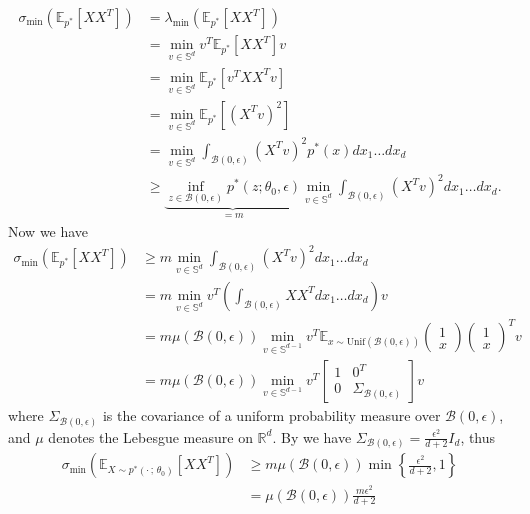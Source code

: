 \documentclass[11pt]{article}
\begin{document}
\begin{align*}
    \sigma_{\min}\left(\mathbb{E}_{p^*}\left[XX^{T}\right]\right) &= \lambda_{\min}\left(\mathbb{E}_{p^*}\left[XX^{T}\right]\right) \\
    &= \min_{v \in \mathbb{S}^{d}}v^{T}\mathbb{E}_{p^*}\left[XX^{T}\right]v \\
    &= \min_{v \in \mathbb{S}^{d}}\mathbb{E}_{p^*}\left[v^{T}XX^{T}v\right] \\
    &= \min_{v \in \mathbb{S}^{d}}\mathbb{E}_{p^*}\left[(X^{T}v)^2\right] \\
    &= \min_{v \in \mathbb{S}^{d}} \int_{\mathcal{B}(0, \epsilon)}(X^{T}v)^2p^*(x)dx_1\dots dx_d \\
    & \geq \underbrace{\inf_{z\in \mathcal{B}(0, \epsilon)}p^*(z;\theta_0, \epsilon)}_{=m}\min_{v \in \mathbb{S}^{d}} \int_{\mathcal{B}(0, \epsilon)}(X^{T}v)^2dx_1\dots dx_d.
\end{align*}
Now we have
\begin{align}
    \sigma_{\min}\left(\mathbb{E}_{ p^*}\left[XX^{T}\right]\right) &\geq m\min_{v \in \mathbb{S}^{d}} \int_{\mathcal{B}(0, \epsilon)}(X^{T}v)^2dx_1\dots dx_d \\
    &= m \min_{v \in \mathbb{S}^{d}} v^{T}\left(\int_{\mathcal{B}(0,\epsilon)}XX^{T} dx_1\dots dx_d\right)v \\
    &= m \mu\left(\mathcal{B}(0, \epsilon)\right) \min_{v \in \mathbb{S}^{d-1}} v^{T}\mathbb{E}_{x\sim \text{Unif}(\mathcal{B}(0,\epsilon))} \begin{pmatrix} 1 \\ x \end{pmatrix}\begin{pmatrix} 1 \\ x \end{pmatrix}^T v\\
    &= m \mu\left(\mathcal{B}(0, \epsilon)\right)  \min_{v \in \mathbb{S}^{d-1}} v^{T} \begin{bmatrix} 1 & 0^T  \\ 0 & \Sigma_{\mathcal{B}(0, \epsilon)}
    \end{bmatrix}v
\end{align}
where $\Sigma_{\mathcal{B}(0,\epsilon)}$ is the covariance of a uniform probability measure over $\mathcal{B}(0,\epsilon)$, and $\mu$ denotes the Lebesgue measure on $\mathbb{R}^d$. By  we have $\Sigma_{\mathcal{B}(0,\epsilon)} = \frac{\epsilon^2}{d+2}I_d$, thus
\begin{align}
    \sigma_{\min}\left(\mathbb{E}_{X\sim p^*(\cdot\,;\,\theta_0)}\left[XX^{T}\right]\right) &\geq m \mu\left(\mathcal{B}(0, \epsilon)\right)  \min\left\{\frac{\epsilon^2}{d+2}, 1\right\} \\
    &= \mu\left(\mathcal{B}(0, \epsilon)\right) \frac{m\epsilon^2}{d+2} \label{eq: denominator bound 2}
\end{align}
\end{document}
